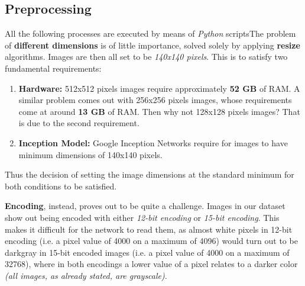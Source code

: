 \documentclass[../main.tex]{subfiles}
\begin{document}
\subsection{Preprocessing}
All the following processes are executed by means of \textit{Python} scriptsThe problem of \textbf{different dimensions} is of little importance, solved solely by applying \textbf{resize} algorithms. Images are then all set to be \textit{140x140 pixels}. This is to satisfy two fundamental requirements:
\begin{enumerate}
	\item \textbf{Hardware:} 512x512 pixels images require approximately \textbf{52 GB} of RAM. A similar problem comes out with 256x256 pixels images, whose requirements come at around \textbf{13 GB} of RAM. Then why not 128x128 pixels images? That is due to the second requirement.
	\item \textbf{Inception Model:} Google Inception Networks require for images to have minimum dimensions of 140x140 pixels.
\end{enumerate}
Thus the decision of setting the image dimensions at the standard minimum for both conditions to be satisfied.

\textbf{Encoding}, instead, proves out to be quite a challenge. Images in our dataset show out being encoded with either \textit{12-bit encoding} or \textit{15-bit encoding}. This makes it difficult for the network to read them, as almost white pixels in 12-bit encoding (i.e. a pixel value of 4000 on a maximum of 4096) would turn out to be darkgray in 15-bit encoded images (i.e. a pixel value of 4000 on a maximum of 32768), where in both encodings a lower value of a pixel relates to a darker color \textit{(all images, as already stated, are grayscale)}.
\end{document}
